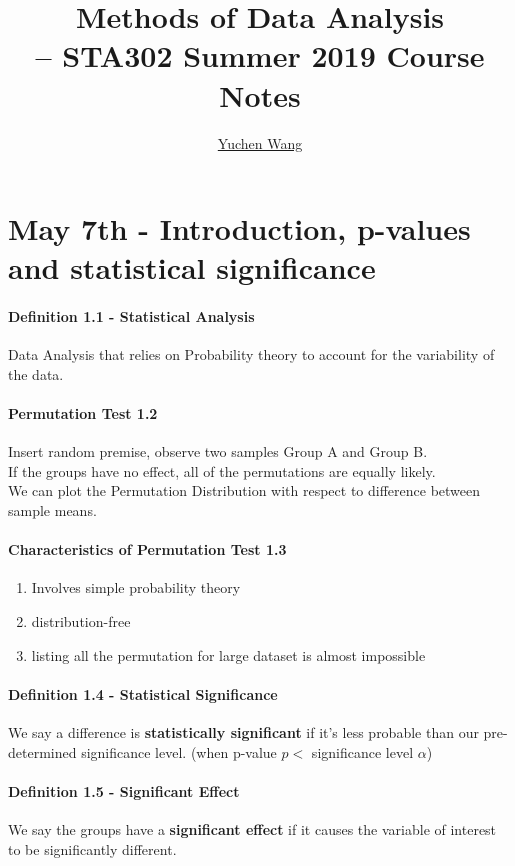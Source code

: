 \documentclass[11pt]{article}
\title{Methods of Data Analysis \\ -- STA302 Summer 2019 Course Notes}
\author{\textcolor{blue}{\href{https://www.yuchenwyc.com}{Yuchen Wang}}}
\begin{document}
    \maketitle
    \tableofcontents
    \newpage

\section{May 7th - Introduction, p-values and statistical significance}
\paragraph{Definition 1.1 - Statistical Analysis} 
Data Analysis that relies on Probability theory to account for the variability of the data.
\paragraph{Permutation Test 1.2}
Insert random premise, observe two samples Group A and Group B. \\
If the groups have no effect, all of the permutations are equally likely. \\
We can plot the Permutation Distribution with respect to difference between sample means.
\paragraph{Characteristics of Permutation Test 1.3}
\begin{enumerate}
	\item Involves simple probability theory
	\item distribution-free
	\item listing all the permutation for large dataset is almost impossible
\end{enumerate}

\paragraph{Definition 1.4 - Statistical Significance}
We say a difference is \textbf{statistically significant} if it's less probable than our pre-determined significance level. (when p-value $p <$  significance level $\alpha$)
\paragraph{Definition 1.5 - Significant Effect} We say the groups have a \textbf{significant effect} if it causes the variable of interest to be significantly different.
\end{document}
